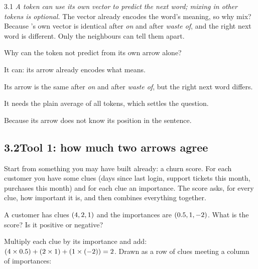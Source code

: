 \begin{wrongidea}{3.1}
\emph{A token can use its own vector to predict the next word; mixing in other tokens is optional.} The vector
already encodes the word's meaning, so why mix? Because 's own vector is identical after \emph{on} and
after \emph{waste of}, and the right next word is different. Only the neighbours can tell them apart.
\end{wrongidea}

\begin{checkq}
Why can the token  not predict  from its own arrow alone?
\begin{options}
\item It can: its arrow already encodes what  means.
\item Its arrow is the same after \emph{on} and after \emph{waste of}, but the right next word differs.
\item It needs the plain average of all tokens, which settles the question.
\item Because its arrow does not know its position in the sentence.
\end{options}
\end{checkq}


\subsection*{3.2\quad Tool 1: how much two arrows agree}

Start from something you may have built already: a churn score. For each customer you have some clues (days
since last login, support tickets this month, purchases this month) and for each clue an importance. The score
asks, for every clue, how important it is, and then combines everything together.

\Predict A customer has clues $(4, 2, 1)$ and the importances are $(0.5, 1, -2)$. What is the score? Is it
positive or negative?

Multiply each clue by its importance and add: $(4\times0.5) + (2\times1) + (1\times(-2)) = 2$. Drawn as a row of clues
meeting a column of importances:
\begin{center}\resizebox{\linewidth}{!}{}\end{center}

